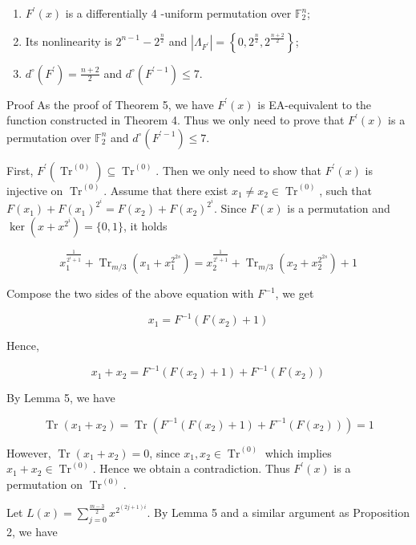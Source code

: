 \documentclass[10pt]{article}
\begin{document}
\begin{enumerate}
  \item $F^{\prime}(x)$ is a differentially 4 -uniform permutation over $\mathbb{F}_{2}^{n}$;
  \item Its nonlinearity is $2^{n-1}-2^{\frac{n}{2}}$ and $\left|\Lambda_{F^{\prime}}\right|=\left\{0,2^{\frac{n}{2}}, 2^{\frac{n+2}{2}}\right\}$;
  \item $d^{\circ}\left(F^{\prime}\right)=\frac{n+2}{2}$ and $d^{\circ}\left(F^{\prime-1}\right) \leq 7$.
\end{enumerate}

Proof As the proof of Theorem 5, we have $F^{\prime}(x)$ is EA-equivalent to the function constructed in Theorem 4. Thus we only need to prove that $F^{\prime}(x)$ is a permutation over $\mathbb{F}_{2}^{n}$ and $d^{\circ}\left(F^{\prime-1}\right) \leq 7$.

First, $F^{\prime}\left(\operatorname{Tr}^{(0)}\right) \subseteq \operatorname{Tr}^{(0)}$. Then we only need to show that $F^{\prime}(x)$ is injective on $\operatorname{Tr}^{(0)}$. Assume that there exist $x_{1} \neq x_{2} \in \operatorname{Tr}^{(0)}$, such that $F\left(x_{1}\right)+F\left(x_{1}\right)^{2^{i}}=F\left(x_{2}\right)+F\left(x_{2}\right)^{2^{i}}$. Since $F(x)$ is a permutation and $\operatorname{ker}\left(x+x^{2^{i}}\right)=\{0,1\}$, it holds

$$
x_{1}^{\frac{1}{2^{i}+1}}+\operatorname{Tr}_{m / 3}\left(x_{1}+x_{1}^{2^{2 s}}\right)=x_{2}^{\frac{1}{2^{i}+1}}+\operatorname{Tr}_{m / 3}\left(x_{2}+x_{2}^{2^{2 s}}\right)+1
$$

Compose the two sides of the above equation with $F^{-1}$, we get

$$
x_{1}=F^{-1}\left(F\left(x_{2}\right)+1\right)
$$

Hence,

$$
x_{1}+x_{2}=F^{-1}\left(F\left(x_{2}\right)+1\right)+F^{-1}\left(F\left(x_{2}\right)\right)
$$

By Lemma 5, we have

$$
\operatorname{Tr}\left(x_{1}+x_{2}\right)=\operatorname{Tr}\left(F^{-1}\left(F\left(x_{2}\right)+1\right)+F^{-1}\left(F\left(x_{2}\right)\right)\right)=1
$$

However, $\operatorname{Tr}\left(x_{1}+x_{2}\right)=0$, since $x_{1}, x_{2} \in \operatorname{Tr}^{(0)}$ which implies $x_{1}+x_{2} \in \operatorname{Tr}^{(0)}$. Hence we obtain a contradiction. Thus $F^{\prime}(x)$ is a permutation on $\operatorname{Tr}^{(0)}$.

Let $L(x)=\sum_{j=0}^{\frac{m-3}{2}} x^{2^{(2 j+1) i}}$. By Lemma 5 and a similar argument as Proposition 2, we have
\end{document}
